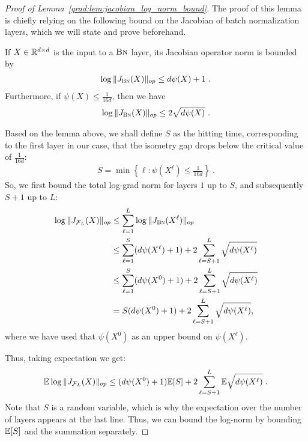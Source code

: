 \begin{proof}[Proof of Lemma~\ref{grad:lem:jacobian_log_norm_bound}]
The proof of this lemma is chiefly relying on the following bound on the Jacobian of batch normalization layers, which we will state and prove beforehand.
\begin{lemma}
\label{grad:lem:jacobian_bn_norm}
    If $X \in \mathbb{R}^{d \times d}$ is the input to a $\text{\sc{Bn}}$ layer, its Jacobian operator norm is bounded by
    \begin{align}
    \log\|J_{\text{\sc{Bn}}}(X)\|_{op} \le d\psi(X)+1~.
    \end{align}
    Furthermore, if $\psi(X) \le \frac{1}{16d}$, then we have
    \begin{align}
    \log\|J_{\text{\sc{Bn}}}(X)\|_{op} \le 2\sqrt{d\psi(X)}~.
    \end{align}
\end{lemma}
Based on the lemma above, we shall define $S$ as the hitting time, corresponding to the first layer in our case, that the isometry gap drops below the critical value of $\frac{1}{16d}$:
\begin{align}
S = \min\left\{\ell: \psi(X^\ell)\le \frac{1}{16d}\right\}~.
\end{align}
So, we first bound the total log-grad norm for layers $1$ up to $S$, and subsequently $S+1$ up to $L$:  
\begin{align}
    \log\|J_{\mathcal{F}_L}(X)\|_{op} 
    &\le \sum_{\ell=1}^L \log\|J_{\text{\sc{Bn}}}(X^\ell)\|_{op} \\
    &\leq \sum_{\ell=1}^S (d\psi(X^\ell)+1) + 2\sum_{\ell=S+1}^L \sqrt{d\psi(X^\ell)} \\
    &\leq \sum_{\ell=1}^S (d\psi(X^0)+1) + 2\sum_{\ell=S+1}^L \sqrt{d\psi(X^\ell)} \\
    &= S(d\psi(X^0)+1) + 2\sum_{\ell=S+1}^L \sqrt{d\psi(X^\ell)}, \label{grad:eqn:op_bound}
\end{align}
where we have used that $\psi(X^0)$ as an upper bound on $\psi(X^\ell)$. 

Thus, taking expectation we get:
\begin{align}
\mathbb{E} \log\|J_{\mathcal{F}_L}(X)\|_{op} \le (d\psi(X^0)+1) \mathbb{E}[S] + 2\sum_{\ell=S+1}^L \mathbb{E} \sqrt{d\psi(X^\ell)}~.
\label{grad:eqn:log_jl}
\end{align}
Note that $S$ is a random variable, which is why the expectation over the number of layers appears at the last line. Thus, we can bound the log-norm by bounding $\mathbb{E}[S]$ and the summation separately. 




\end{proof}
